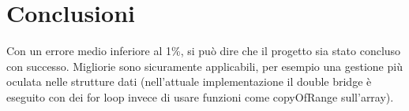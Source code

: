 \chapter*{Conclusioni}
\label{cha_conclusioni}
Con un errore medio inferiore al 1\%, si può dire che il progetto sia stato concluso con successo. Migliorie sono sicuramente applicabili, per esempio una gestione più oculata nelle strutture dati (nell'attuale implementazione il double bridge è eseguito con dei for loop invece di usare funzioni come copyOfRange sull'array).
